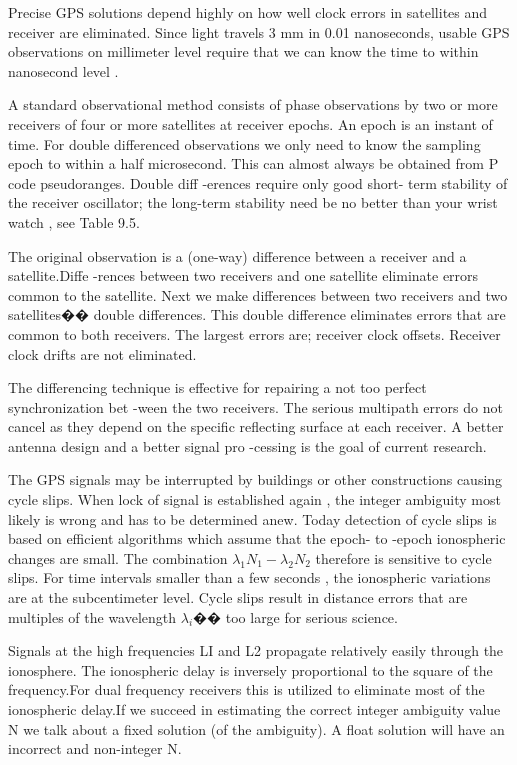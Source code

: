 Precise GPS solutions depend highly on how well clock errors in satellites and receiver
are eliminated. Since light travels 3 mm in 0.01 nanoseconds, usable GPS observations
on millimeter level require that we can know the time to within nanosecond level .

A standard observational method consists of phase observations by two or more receivers
of four or more satellites at receiver epochs. An epoch is an instant of time. For double differenced observations we only need to know the sampling epoch to within a half microsecond. This can almost always be obtained from P code pseudoranges. Double diff
-erences require only good short- term stability of the receiver oscillator; the long-term stability need be no better than your wrist watch , see Table 9.5.

The original observation is a (one-way) difference between a receiver and a satellite.Diffe
-rences between two receivers and one satellite eliminate errors common to the satellite. Next we make differences between two receivers and two satellites�� double differences. This double difference eliminates errors that are common to both receivers. The largest errors are; receiver clock offsets. Receiver clock drifts are not eliminated.

The differencing technique is effective for repairing a not too perfect synchronization bet
-ween the two receivers. The serious multipath errors do not cancel as they depend on the specific reflecting surface at each receiver. A better antenna design and a better signal pro
-cessing is the goal of current research.

The GPS signals may be interrupted by buildings or other constructions causing cycle slips. When lock of signal is established again , the integer ambiguity most likely is wrong and has to be determined anew. Today detection of cycle slips is based on efficient algorithms which assume that the epoch- to -epoch ionospheric changes are small. The combination $\lambda_{1}N_{1}-\lambda_{2}N_{2}$ therefore is sensitive to cycle slips. For time intervals smaller than a few seconds , the ionospheric variations are at the subcentimeter level. Cycle slips result in distance errors that are multiples of the wavelength $\lambda_{i}$�� too large for serious science.

Signals at the high frequencies LI and L2 propagate relatively easily through the ionosphere. The ionospheric delay is inversely proportional to the square of the frequency.For dual frequency receivers this is utilized to eliminate most of the ionospheric delay.If we succeed in estimating the correct integer ambiguity value N we talk about a fixed solution (of the ambiguity). A float solution will have an incorrect and non-integer N.

